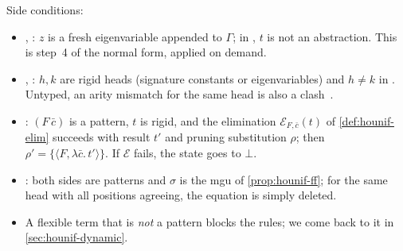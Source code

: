 Side conditions:
\begin{itemize}
  \item {}, : $z$ is a fresh eigenvariable appended to $\Gamma$; in , $t$ is
    not an abstraction. This is step~4 of the normal form, applied on demand.
  \item {}, : $h,k$ are rigid heads (signature constants or eigenvariables) and $h\ne k$
    in . Untyped, an arity mismatch for the same head is also a clash~\cite[\S9.3]{Miller1991}.
  \item {}: $(F\,\bar c)$ is a pattern, $t$ is rigid, and the elimination
    $\mathcal E_{F,\bar c}(t)$ of \cref{def:hounif-elim} succeeds with result $t'$ and pruning substitution $\rho$;
    then $\rho'=\{\langle F,\lambda\bar c.\,t'\rangle\}$. If $\mathcal E$ fails, the state goes to $\bot$.
  \item {}: both sides are patterns and $\sigma$ is the mgu of \cref{prop:hounif-ff}; for the
    same head with all positions agreeing, the equation is simply deleted.
  \item A flexible term that is \emph{not} a pattern blocks the rules; we come back to it in
    \cref{sec:hounif-dynamic}.
\end{itemize}

